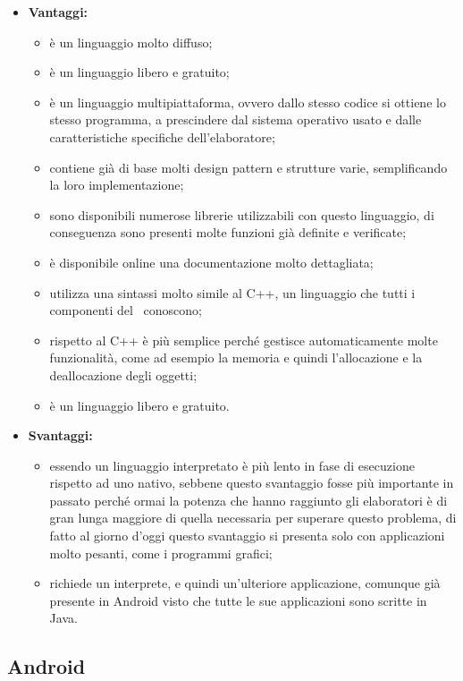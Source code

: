 	\begin{itemize}
		\item \textbf{Vantaggi:}
			\begin{itemize}
				\item è un linguaggio molto diffuso;
				\item è un linguaggio libero e gratuito;
				\item è un linguaggio multipiattaforma, ovvero dallo stesso codice si ottiene lo stesso programma, a prescindere dal sistema operativo usato e dalle caratteristiche specifiche dell'elaboratore;
				\item contiene già di base molti design pattern e strutture varie, semplificando la loro implementazione;
				\item sono disponibili numerose librerie utilizzabili con questo linguaggio, di conseguenza sono presenti molte funzioni già definite e verificate;
				\item è disponibile online una documentazione molto dettagliata;
				\item utilizza una sintassi molto simile al C++, un linguaggio che tutti i componenti del \ conoscono;
				\item rispetto al C++ è più semplice perché gestisce automaticamente molte funzionalità, come ad esempio la memoria e quindi l'allocazione e la deallocazione degli oggetti;
				\item è un linguaggio libero e gratuito. %
			\end{itemize}
		\item \textbf{Svantaggi:}
			\begin{itemize}
				\item essendo un linguaggio interpretato è più lento in fase di esecuzione rispetto ad uno nativo, sebbene questo svantaggio fosse più importante in passato perché ormai la potenza che hanno raggiunto gli elaboratori è di gran lunga maggiore di quella necessaria per superare questo problema, di fatto al giorno d'oggi questo svantaggio si presenta solo con applicazioni molto pesanti, come i programmi grafici;
				\item richiede un interprete, e quindi un'ulteriore applicazione, comunque già presente in Android visto che tutte le sue applicazioni sono scritte in Java.
			\end{itemize}
	\end{itemize}
	
\subsection{Android} %

